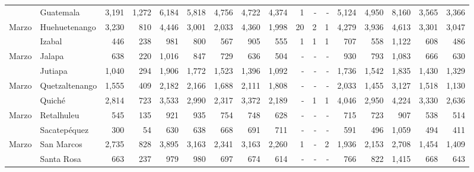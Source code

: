 \begin{landscape}
\begin{center}
\begin{longtable}{llrrrrrrrrrrrrrrr}
			\rowcolor{color1!5!white}\multicolumn{1}{l}{	\footnotesize	 Marzo 	}&	 Guatemala 	&	 3,191 	&	 1,272 	&	 6,184 	&	 5,818 	&	 4,756 	&	 4,722 	&	 4,374 	&	 1 	&	 -   	&	 -   	&	 5,124 	&	 4,950 	&	 8,160 	&	 3,565 	&	 3,366 	\\
			\multicolumn{1}{l}{	\footnotesize	 Marzo 	}&	 Huehuetenango 	&	 3,230 	&	 810 	&	 4,446 	&	 3,001 	&	 2,033 	&	 4,360 	&	 1,998 	&	 20 	&	 2 	&	 1 	&	 4,279 	&	 3,936 	&	 4,613 	&	 3,301 	&	 3,047 	\\
			\rowcolor{color1!5!white}\multicolumn{1}{l}{	\footnotesize	 Marzo 	}&	 Izabal 	&	 446 	&	 238 	&	 981 	&	 800 	&	 567 	&	 905 	&	 555 	&	 1 	&	 1 	&	 1 	&	 707 	&	 558 	&	 1,122 	&	 608 	&	 486 	\\
			\multicolumn{1}{l}{	\footnotesize	 Marzo 	}&	 Jalapa 	&	 638 	&	 220 	&	 1,016 	&	 847 	&	 729 	&	 636 	&	 504 	&	 -   	&	 -   	&	 -   	&	 930 	&	 793 	&	 1,083 	&	 666 	&	 630 	\\
			\rowcolor{color1!5!white}\multicolumn{1}{l}{	\footnotesize	 Marzo 	}&	 Jutiapa 	&	 1,040 	&	 294 	&	 1,906 	&	 1,772 	&	 1,523 	&	 1,396 	&	 1,092 	&	 -   	&	 -   	&	 -   	&	 1,736 	&	 1,542 	&	 1,835 	&	 1,430 	&	 1,329 	\\
			\multicolumn{1}{l}{	\footnotesize	 Marzo 	}&	 Quetzaltenango 	&	 1,555 	&	 409 	&	 2,182 	&	 2,166 	&	 1,688 	&	 2,111 	&	 1,808 	&	 -   	&	 -   	&	 -   	&	 2,033 	&	 1,455 	&	 3,127 	&	 1,518 	&	 1,130 	\\
			\rowcolor{color1!5!white}\multicolumn{1}{l}{	\footnotesize	 Marzo 	}&	 Quiché 	&	 2,814 	&	 723 	&	 3,533 	&	 2,990 	&	 2,317 	&	 3,372 	&	 2,189 	&	 -   	&	 1 	&	 1 	&	 4,046 	&	 2,950 	&	 4,224 	&	 3,330 	&	 2,636 	\\
			\multicolumn{1}{l}{	\footnotesize	 Marzo 	}&	 Retalhuleu 	&	 545 	&	 135 	&	 921 	&	 935 	&	 754 	&	 748 	&	 628 	&	 -   	&	 -   	&	 -   	&	 715 	&	 723 	&	 907 	&	 538 	&	 514 	\\
			\rowcolor{color1!5!white}\multicolumn{1}{l}{	\footnotesize	 Marzo 	}&	 Sacatepéquez 	&	 300 	&	 54 	&	 630 	&	 638 	&	 668 	&	 691 	&	 711 	&	 -   	&	 -   	&	 -   	&	 591 	&	 496 	&	 1,059 	&	 494 	&	 411 	\\
			\multicolumn{1}{l}{	\footnotesize	 Marzo 	}&	 San Marcos 	&	 2,735 	&	 828 	&	 3,895 	&	 3,163 	&	 2,341 	&	 3,163 	&	 2,260 	&	 1 	&	 -   	&	 2 	&	 1,936 	&	 2,153 	&	 2,708 	&	 1,454 	&	 1,409 	\\
			\rowcolor{color1!5!white}\multicolumn{1}{l}{	\footnotesize	 Marzo 	}&	 Santa Rosa 	&	 663 	&	 237 	&	 979 	&	 980 	&	 697 	&	 674 	&	 614 	&	 -   	&	 -   	&	 -   	&	 766 	&	 822 	&	 1,415 	&	 668 	&	 643 	\\

\end{longtable}
\end{center}
\end{landscape}
